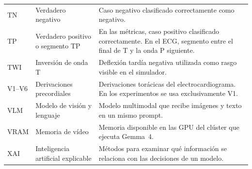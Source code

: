 {\begin{longtable}{@{}>{\raggedright\arraybackslash}p{2.20cm}>{\raggedright\arraybackslash}p{4.10cm}>{\raggedright\arraybackslash}p{7.95cm}@{}}
TN & Verdadero negativo & Caso negativo clasificado correctamente como negativo. \\
TP & Verdadero positivo o segmento TP & En las métricas, caso positivo clasificado correctamente. En el ECG, segmento entre el final de T y la onda P siguiente. \\
TWI & Inversión de onda T & Deflexión tardía negativa utilizada como rasgo visible en el simulador. \\
V1--V6 & Derivaciones precordiales & Derivaciones torácicas del electrocardiograma. En los experimentos se usa exclusivamente V1. \\
VLM & Modelo de visión y lenguaje & Modelo multimodal que recibe imágenes y texto en un mismo prompt. \\
VRAM & Memoria de vídeo & Memoria disponible en las GPU del clúster que ejecuta Gemma~4. \\
XAI & Inteligencia artificial explicable & Métodos para examinar qué información se relaciona con las decisiones de un modelo. \\
\end{longtable}
}
